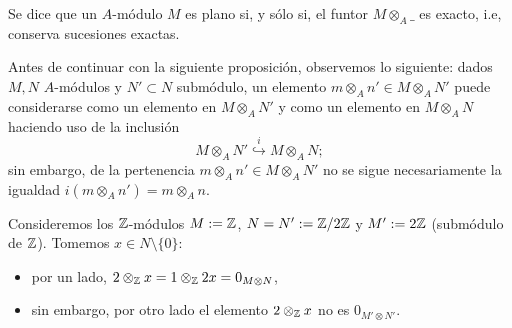 \documentclass[../main.tex]{subfiles}
\begin{document}
\begin{definition}
	Se dice que un $A$-módulo $M$ es plano si, y sólo si, el funtor $M\otimes_A \_$ es exacto, i.e, conserva sucesiones exactas.
\end{definition}

Antes de continuar con la siguiente proposición, observemos lo siguiente: dados $M,N$ $A$-módulos y $N'\subset N$ submódulo, un elemento $m\otimes_A n'\in M\otimes_A N'$ puede considerarse como un elemento en $M\otimes_A N'$ y como un elemento en $M\otimes_A N$ haciendo uso de la inclusión $$M\otimes_A N'\overset{i}{\hookrightarrow}M\otimes_A N;$$
sin embargo, de la pertenencia $m\otimes_A n'\in M\otimes_A N'$ no se sigue necesariamente la igualdad $i(m\otimes_A n')=m\otimes_A n$.

\begin{example}
	Consideremos los $\mathbb{Z}$-módulos $M:=\mathbb{Z}$, $N=N':=\mathbb{Z}/2\mathbb{Z}$ y $M':=2\mathbb{Z}$ (submódulo de $\mathbb{Z}$). Tomemos $x\in N\setminus\{0\}$:
	\begin{itemize}
		\item por un lado, $2\otimes_{\mathbb{Z}} x=1\otimes_{\mathbb{Z}} 2x=0_{M\otimes N}$,
		\item sin embargo, por otro lado el elemento $2\otimes_{\mathbb{Z}} x$ no es $0_{M'\otimes N'}$.
	\end{itemize}
\end{example}
\end{document}
